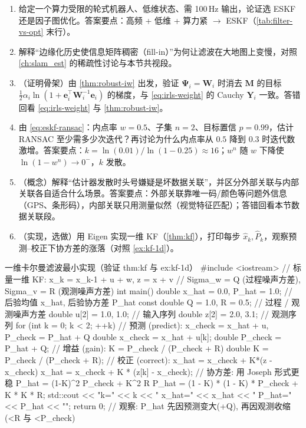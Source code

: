 \begin{practice}
\begin{enumerate}
  \item 给定一个算力受限的轮式机器人、低维状态、需 100\,Hz 输出，论证选 ESKF 还是因子图优化。答案要点：高频 + 低维 + 算力紧 $\to$ ESKF（\cref{tab:filter-vs-opt} 末行）。
  \item 解释“边缘化历史使信息矩阵稠密（fill-in）”为何让滤波在大地图上变慢，对照 \cref{ch:slam_est} 的稀疏性讨论与本节共视段。
  \item （证明骨架）由 \cref{thm:robust-iw} 出发，验证 $\boldsymbol{\Psi}_i=\mathbf{W}_i$ 时消去 $\mathbf{M}$ 的目标 $\tfrac12\alpha_i\ln(1+\mathbf{e}_i^\top\mathbf{W}_i^{-1}\mathbf{e}_i)$ 的梯度，与 \cref{eq:irls-weight} 的 Cauchy $\mathbf{Y}_i$ 一致。答错回看 \cref{eq:irls-weight} 与 \cref{thm:robust-iw}。
  \item 由 \cref{eq:eskf-ransac}：内点率 $w=0.5$、子集 $n=2$、目标置信 $p=0.99$，估计 RANSAC 至少需多少次迭代？再讨论为什么内点率从 $0.5$ 降到 $0.3$ 时迭代数激增。答案要点：$k=\ln(0.01)/\ln(1-0.25)\approx16$；$w^n$ 随 $w$ 下降使 $\ln(1-w^n)\to0^-$，$k$ 发散。
  \item （概念）解释“估计器发散时头号嫌疑是坏数据关联”，并区分外部关联与内部关联各自适合什么场景。答案要点：外部关联靠唯一码/颜色等问题外信息（GPS、条形码），内部关联只用测量似然（视觉特征匹配）；答错回看本节数据关联段。
  \item （实现，选做）用 Eigen 实现一维 KF（\cref{thm:kf}），打印每步 $\hat{x}_k,\hat{P}_k$，观察预测–校正下协方差的涨落（对照 \cref{ex:kf-1d}）。
\end{enumerate}
\end{practice}

\begin{codebox}[C++]{一维卡尔曼滤波最小实现（验证 thm:kf 与 ex:kf-1d）}
#include <iostream>
// 标量一维 KF: x_k = x_{k-1} + u + w,  z = x + v
// Sigma_w = Q (过程噪声方差),  Sigma_v = R (观测噪声方差)
int main() {
  double x_hat = 0.0, P_hat = 1.0;        // 后验均值 x_hat, 后验协方差 P_hat
  const double Q = 1.0, R = 0.5;          // 过程 / 观测噪声方差
  double u[2] = {1.0, 1.0};               // 输入序列
  double z[2] = {2.0, 3.1};               // 观测序列
  for (int k = 0; k < 2; ++k) {
    // 预测 (predict): x_check = x_hat + u,  P_check = P_hat + Q
    double x_check = x_hat + u[k];
    double P_check = P_hat + Q;
    // 增益 (gain): K = P_check / (P_check + R)
    double K = P_check / (P_check + R);
    // 校正 (correct): x_hat = x_check + K*(z - x_check)
    x_hat = x_check + K * (z[k] - x_check);
    // 协方差: 用 Joseph 形式更稳 P_hat = (1-K)^2 P_check + K^2 R
    P_hat = (1 - K) * (1 - K) * P_check + K * K * R;
    std::cout << "k=" << k << " x_hat=" << x_hat << " P_hat=" << P_hat << "\n";
  }
  return 0;   // 观察: P_hat 先因预测变大(+Q), 再因观测收缩(<R 与 <P_check)
}
\end{codebox}

